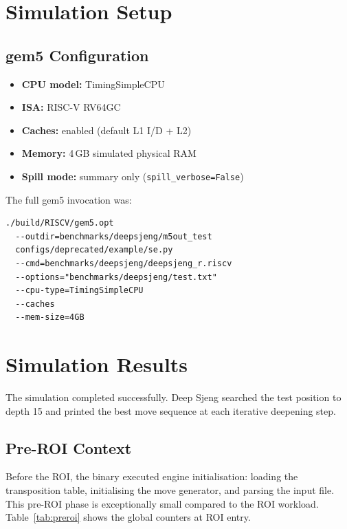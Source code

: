 \documentclass[conference]{IEEEtran}
\begin{document}
\section{Simulation Setup}

\subsection{gem5 Configuration}

\begin{itemize}
    \item \textbf{CPU model:}   TimingSimpleCPU
    \item \textbf{ISA:}         RISC-V RV64GC
    \item \textbf{Caches:}      enabled (default L1 I/D + L2)
    \item \textbf{Memory:}      4\,GB simulated physical RAM
    \item \textbf{Spill mode:}  summary only (\texttt{spill\_verbose=False})
\end{itemize}

The full gem5 invocation was:

\begin{verbatim}
./build/RISCV/gem5.opt
  --outdir=benchmarks/deepsjeng/m5out_test
  configs/deprecated/example/se.py
  --cmd=benchmarks/deepsjeng/deepsjeng_r.riscv
  --options="benchmarks/deepsjeng/test.txt"
  --cpu-type=TimingSimpleCPU
  --caches
  --mem-size=4GB
\end{verbatim}

\section{Simulation Results}

The simulation completed successfully. Deep Sjeng searched the test
position to depth 15 and printed the best move sequence at each
iterative deepening step.

\subsection{Pre-ROI Context}

Before the ROI, the binary executed engine initialisation: loading
the transposition table, initialising the move generator, and parsing
the input file. This pre-ROI phase is exceptionally small compared to
the ROI workload. Table~\ref{tab:preroi} shows the global counters at
ROI entry.
\end{document}
